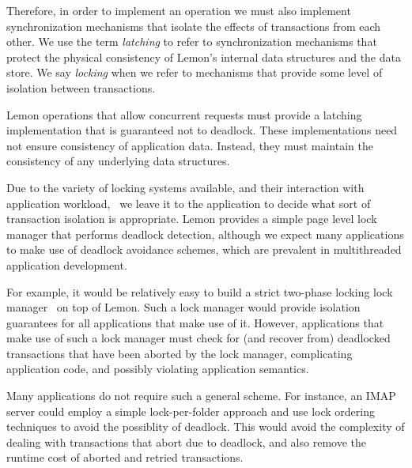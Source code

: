 \documentclass[letterpaper,twocolumn,english]{article}
\newcommand{\yad}{Lemon\xspace}
\begin{document}

Therefore, in order to implement an operation we must also implement
synchronization mechanisms that isolate the effects of transactions
from each other.  We use the term {\em latching} to refer to
synchronization mechanisms that protect the physical consistency of
\yad's internal data structures and the data store.  We say {\em
locking} when we refer to mechanisms that provide some level of
isolation between transactions.  

\yad operations that allow concurrent requests must provide a
latching implementation that is guaranteed not to deadlock.  These
implementations need not ensure consistency of application data.
Instead, they must maintain the consistency of any underlying data
structures.

Due to the variety of locking systems available, and their interaction
with application workload,~\cite{multipleGenericLocking} we leave it
to the application to decide what sort of transaction isolation is
appropriate.  \yad provides a simple page level lock manager that
performs deadlock detection, although we expect many applications to
make use of deadlock avoidance schemes, which are prevalent in
multithreaded application development.

For example, it would be relatively easy to build a strict two-phase
locking lock
manager~\cite{hierarcicalLocking,hierarchicalLockingOnAriesExample} on
top of \yad.  Such a lock manager would provide isolation guarantees
for all applications that make use of it.  However, applications that
make use of such a lock manager must check for (and recover from)
deadlocked transactions that have been aborted by the lock manager,
complicating application code, and possibly violating application semantics.

Many applications do not require such a general scheme.  For instance,
an IMAP server could employ a simple lock-per-folder approach and use
lock ordering techniques to avoid the possiblity of deadlock.  This
would avoid the complexity of dealing with transactions that abort due
to deadlock, and also remove the runtime cost of aborted and retried
transactions.  
\end{document}
